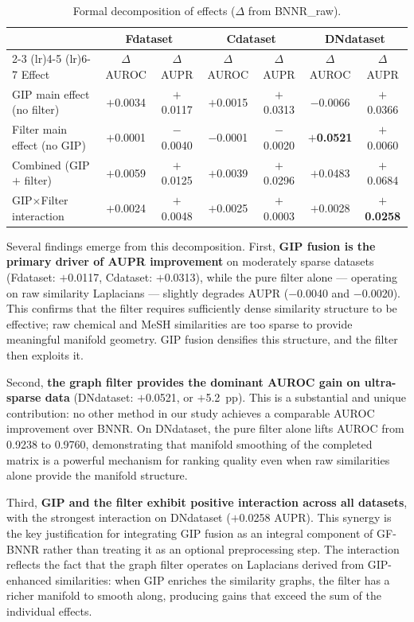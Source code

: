 \documentclass[unnumsec,webpdf,contemporary,large]{oup-authoring-template}
\begin{document}
\begin{table}[t]
\centering
\caption{Formal decomposition of effects ($\Delta$ from BNNR\_raw).}
\label{tab:decomposition}
\begin{tabular}{l c c c c c c}
\toprule
& \multicolumn{2}{c}{Fdataset} & \multicolumn{2}{c}{Cdataset} & \multicolumn{2}{c}{DNdataset} \\
\cmidrule(lr){2-3} \cmidrule(lr){4-5} \cmidrule(lr){6-7}
Effect & $\Delta$AUROC & $\Delta$AUPR & $\Delta$AUROC & $\Delta$AUPR & $\Delta$AUROC & $\Delta$AUPR \\
\midrule
GIP main effect (no filter)
  & $+$0.0034 & $+$0.0117 & $+$0.0015 & $+$0.0313 & $-$0.0066 & $+$0.0366 \\
Filter main effect (no GIP)
  & $+$0.0001 & $-$0.0040 & $-$0.0001 & $-$0.0020 & \textbf{$+$0.0521} & $+$0.0060 \\
Combined (GIP $+$ filter)
  & $+$0.0059 & $+$0.0125 & $+$0.0039 & $+$0.0296 & $+$0.0483 & $+$0.0684 \\
GIP$\times$Filter interaction
  & $+$0.0024 & $+$0.0048 & $+$0.0025 & $+$0.0003 & $+$0.0028 & \textbf{$+$0.0258} \\
\bottomrule
\end{tabular}
\end{table}

Several findings emerge from this decomposition. First, \textbf{GIP fusion is the primary driver of AUPR improvement} on moderately sparse datasets (Fdataset: $+$0.0117, Cdataset: $+$0.0313), while the pure filter alone --- operating on raw similarity Laplacians --- slightly degrades AUPR ($-$0.0040 and $-$0.0020). This confirms that the filter requires sufficiently dense similarity structure to be effective; raw chemical and MeSH similarities are too sparse to provide meaningful manifold geometry. GIP fusion densifies this structure, and the filter then exploits it.

Second, \textbf{the graph filter provides the dominant AUROC gain on ultra-sparse data} (DNdataset: $+$0.0521, or $+$5.2~pp). This is a substantial and unique contribution: no other method in our study achieves a comparable AUROC improvement over BNNR. On DNdataset, the pure filter alone lifts AUROC from 0.9238 to 0.9760, demonstrating that manifold smoothing of the completed matrix is a powerful mechanism for ranking quality even when raw similarities alone provide the manifold structure.

Third, \textbf{GIP and the filter exhibit positive interaction across all datasets}, with the strongest interaction on DNdataset ($+$0.0258 AUPR). This synergy is the key justification for integrating GIP fusion as an integral component of GF-BNNR rather than treating it as an optional preprocessing step. The interaction reflects the fact that the graph filter operates on Laplacians derived from GIP-enhanced similarities: when GIP enriches the similarity graphs, the filter has a richer manifold to smooth along, producing gains that exceed the sum of the individual effects.
\end{document}
